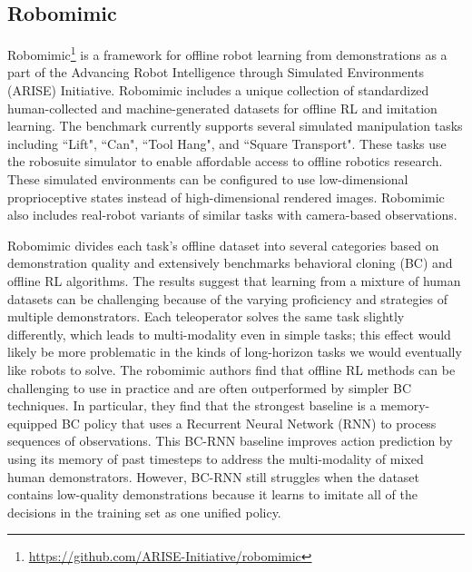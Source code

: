 \subsection{Robomimic}
Robomimic\footnote{\url{https://github.com/ARISE-Initiative/robomimic}} \cite{robomimic2021} is a framework for offline robot learning from demonstrations as a part of the Advancing Robot Intelligence through Simulated Environments (ARISE) Initiative. Robomimic includes a unique collection of standardized human-collected and machine-generated datasets for offline RL and imitation learning. The benchmark currently supports several simulated manipulation tasks including ``Lift", ``Can", ``Tool Hang", and ``Square Transport". These tasks use the robosuite simulator \cite{zhu2020robosuite} to enable affordable access to offline robotics research. These simulated environments can be configured to use low-dimensional proprioceptive states instead of high-dimensional rendered images. Robomimic also includes real-robot variants of similar tasks with camera-based observations.

Robomimic divides each task's offline dataset into several categories based on demonstration quality and extensively benchmarks behavioral cloning (BC) and offline RL algorithms. The results suggest that learning from a mixture of human datasets can be challenging because of the varying proficiency and strategies of multiple demonstrators. Each teleoperator solves the same task slightly differently, which leads to multi-modality even in simple tasks; this effect would likely be more problematic in the kinds of long-horizon tasks we would eventually like robots to solve. The robomimic authors find that offline RL methods can be challenging to use in practice and are often outperformed by simpler BC techniques. In particular, they find that the strongest baseline is a memory-equipped BC policy that uses a Recurrent Neural Network (RNN) to process sequences of observations. This BC-RNN baseline improves action prediction by using its memory of past timesteps to address the multi-modality of mixed human demonstrators. However, BC-RNN still struggles when the dataset contains low-quality demonstrations because it learns to imitate all of the decisions in the training set as one unified policy.

